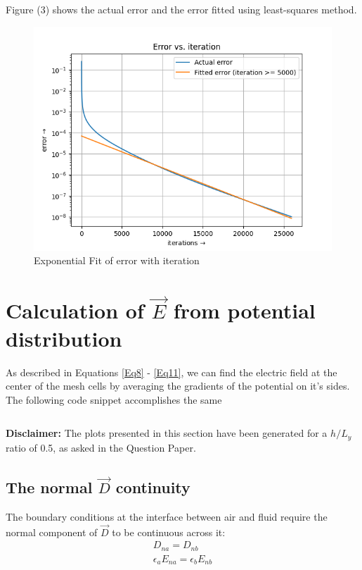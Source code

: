 \documentclass[11pt, a4paper, twoside]{report}
\begin{document}
            Figure (3) shows the actual error and the error fitted using least-squares method.

            \begin{figure}[H]
                \centering
                \includegraphics[scale=0.75]{Fig2.png}
                \caption{Exponential Fit of error with iteration}
            \end{figure}

    \section{Calculation of $\vec{E}$ from potential distribution}
        As described in Equations \eqref{Eq8} - \eqref{Eq11}, we can find the electric field at the center of the mesh cells by averaging the gradients of the potential on it's sides. The following code snippet accomplishes the same

        \inputminted[linenos, breaklines=True, fontsize=\footnotesize]{python}{findEField.py}

        \textbf{Disclaimer:} The plots presented in this section have been generated for a $h/L_y$ ratio of 0.5, as asked in the Question Paper.

        \subsection{The normal $\vec{D}$ continuity}
            The boundary conditions at the interface between air and fluid require the normal component of $\vec{D}$ to be continuous across it:
            \begin{gather}
                D_{na} = D_{nb}\\
                \epsilon_a E_{na} = \epsilon_b E_{nb}
            \end{gather}
\end{document}
